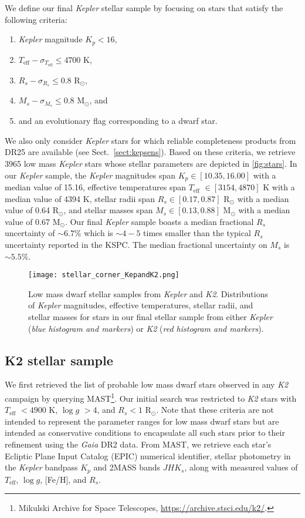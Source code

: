 \documentclass[twocolumn]{emulateapj}
\newcommand{\gaia}[1]{\emph{Gaia}#1}
\newcommand{\kepler}[1]{\emph{Kepler}#1}
\newcommand{\ktwo}[1]{\emph{K2}#1}
\newcommand{\teff}[1]{$T_{\text{eff}}$#1}
\newcommand{\logg}[1]{$\log{g}$#1}
\begin{document}
We define our final \kepler{} stellar sample by focusing on stars that satisfy the following criteria:

\begin{enumerate}
\item \kepler{} magnitude $K_p < 16$,
\item $T_{\text{eff}} - \sigma_{T_{\text{eff}}} \leq 4700$ K,
\item $R_s - \sigma_{R_s} \leq 0.8$ R$_{\odot}$,
\item $M_s - \sigma_{M_s} \leq 0.8$ M$_{\odot}$, and
\item and an evolutionary flag corresponding to a dwarf star. 
\end{enumerate}

\noindent We also only consider \kepler{} stars for which reliable completeness products from DR25
are available (see Sect.~\ref{sect:kepsens}). Based on these criteria, we retrieve 3965 low mass \kepler{}
stars whose stellar parameters are depicted in \autoref{fig:stars}.
In our \kepler{} sample, the \kepler{} magnitudes span $K_p \in [10.35, 16.00]$ with a median value of 15.16,
effective temperatures span \teff{} $\in [3154, 4870]$ K with a median value of 4394 K,
stellar radii span $R_s \in [0.17, 0.87]$ R$_{\odot}$ with a median value of 0.64 R$_{\odot}$, and
stellar masses span $M_s \in [0.13, 0.88]$ M$_{\odot}$ with a median value of 0.67 M$_{\odot}$.
Our final \kepler{} sample boasts a median fractional $R_s$ uncertainty of $\sim 6.7$\% which is $\sim 4-5$
times smaller than the typical $R_s$ uncertainty reported in the KSPC. The median fractional uncertainty on
$M_s$ is $\sim 5.5$\%.

\begin{figure}
  \centering
  \texttt{[image: stellar\_corner\_KepandK2.png]}
  \caption{Low mass dwarf stellar samples from \kepler{} and \ktwo{.} Distributions of \kepler{} magnitudes,
    effective temperatures, stellar radii, and stellar masses for stars in our final stellar sample from either
    \kepler{} (\emph{blue histogram and markers}) or \ktwo{} (\emph{red histogram and markers}).}
  \label{fig:stars}
\end{figure}

\subsection{K2 stellar sample}
We first retrieved the list of probable low mass dwarf stars observed in any \ktwo{} campaign by querying
MAST\footnote{Mikulski Archive for Space Telescopes, \url{https://archive.stsci.edu/k2/}.}. Our initial
search was restricted to \ktwo{} stars with \teff{} $<4900$ K, \logg{} $>4$, and $R_s<1$ R$_{\odot}$. Note that these
criteria are not intended to represent the parameter ranges for low mass dwarf stars but are intended as
conservative conditions to encapsulate all such stars prior to their refinement using the \gaia{} DR2
data. From MAST, we retrieve each star's Ecliptic Plane Input Catalog
(EPIC) numerical identifier, stellar photometry in the \kepler{} bandpass $K_p$ and 2MASS bands $JHK_s$, along
with measured values of \teff{,} \logg{,} [Fe/H], and $R_s$.
\end{document}
